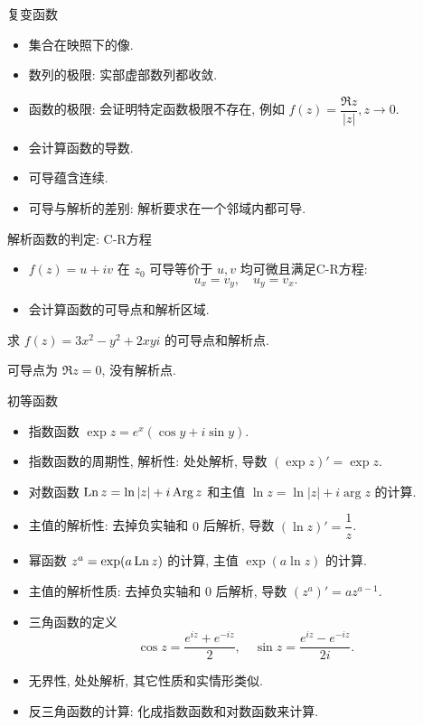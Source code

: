 \documentclass[12pt]{ctexbeamer}
\begin{document}
\begin{frame}{复变函数}
\begin{itemize}
\item 集合在映照下的像.
\item 数列的极限: 实部虚部数列都收敛.
\item 函数的极限: 会证明特定函数极限不存在, 例如 $f(z)=\dfrac{\Re z}{|z|}, z\to 0$.
\item 会计算函数的导数.
\item 可导蕴含连续.
\item 可导与解析的差别: 解析要求在一个邻域内都可导.
\end{itemize}
\end{frame}


\begin{frame}{解析函数的判定: C-R方程}
\begin{itemize}
\item $f(z)=u+iv$ 在 $z_0$ 可导等价于 $u,v$ 均可微且满足C-R方程:
\[u_x=v_y,\quad u_y=v_x.\]
\item 会计算函数的可导点和解析区域.
\end{itemize}
\begin{exercise}
求 $f(z)=3x^2-y^2+2xyi$ 的可导点和解析点.
\end{exercise}
\begin{answer}
可导点为 $\Re z=0$, 没有解析点.
\end{answer}
\end{frame}


\begin{frame}{初等函数}
\begin{itemize}
\item 指数函数 $\exp z=e^x(\cos y+i\sin y)$.
\item 指数函数的周期性, 解析性: 处处解析, 导数 $(\exp z)'=\exp z$.
\item 对数函数 $\operatorname{Ln} z=\ln|z|+i\operatorname{Arg} z$ 和主值 $\ln z=\ln|z|+i\arg z$ 的计算.
\item 主值的解析性: 去掉负实轴和 $0$ 后解析, 导数 $(\ln z)'=\dfrac1z$.
\item 幂函数 $z^a=\exp(a\operatorname{Ln} z)$ 的计算, 主值 $\exp(a\ln z)$ 的计算.
\item 主值的解析性质: 去掉负实轴和 $0$ 后解析, 导数 $(z^a)'=az^{a-1}$.
\item 三角函数的定义
\[\cos z=\frac{e^{iz}+e^{-iz}}2,\quad
\sin z=\frac{e^{iz}-e^{-iz}}{2i}.\]
\item 无界性, 处处解析, 其它性质和实情形类似.
\item 反三角函数的计算: 化成指数函数和对数函数来计算.
\end{itemize}
\end{frame}
\end{document}
